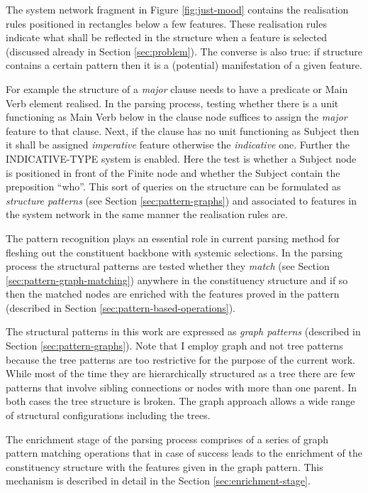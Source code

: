 The system network fragment in Figure \ref{fig:just-mood} contains the realisation rules positioned in rectangles below a few features. These realisation rules indicate what shall be reflected in the structure when a feature is selected (discussed already in Section \ref{sec:problem}). The converse is also true: if structure contains a certain pattern then it is a (potential) manifestation of a given feature.

For example the structure of a \textit{major} clause needs to have a predicate or Main Verb element realised. In the parsing process, testing whether there is a unit functioning as Main Verb below in the clause node suffices to assign the \textit{major} feature to that clause. Next, if the clause has no unit functioning as Subject then it shall be assigned \textit{imperative} feature otherwise the \textit{indicative} one. Further the INDICATIVE-TYPE system is enabled. Here the test is whether a Subject node is positioned in front of the Finite node and whether the Subject contain the preposition ``who''. This sort of queries on the structure can be formulated as \textit{structure patterns} (see Section \ref{sec:pattern-graphs}) and associated to features in the system network in the same manner the realisation rules are. 

The pattern recognition plays an essential role in current parsing method for fleshing out the constituent backbone with systemic selections. In the parsing process the structural patterns are tested whether they \textit{match} (see Section \ref{sec:pattern-graph-matching}) anywhere in the constituency structure and if so then the matched nodes are enriched with the features proved in the pattern (described in Section \ref{sec:pattern-based-operations}). 

The structural patterns in this work are expressed as \textit{graph patterns} (described in Section \ref{sec:pattern-graphs}). Note that I employ graph and not tree patterns because the tree patterns are too restrictive for the purpose of the current work. While most of the time they are hierarchically structured as a tree there are few patterns that involve sibling connections or nodes with more than one parent. In both cases the tree structure is broken. The graph approach allows a wide range of structural configurations including the trees. 

The enrichment stage of the parsing process comprises of a series of graph pattern matching operations that in case of success leads to the enrichment of the constituency structure with the features given in the graph pattern. This mechanism is described in detail in the Section \ref{sec:enrichment-stage}. 


